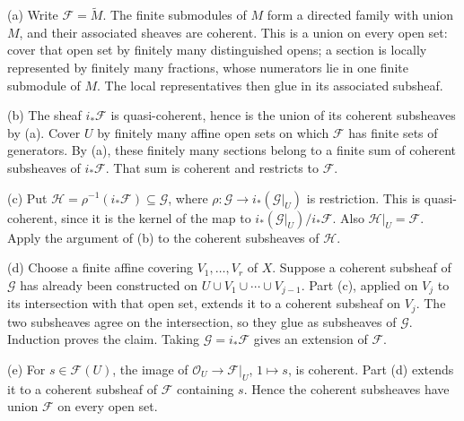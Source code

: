 (a) Write $\mathcal F=\widetilde M$. The finite submodules of $M$ form a directed family with union $M$, and their associated sheaves are coherent. This is a union on every open set: cover that open set by finitely many distinguished opens; a section is locally represented by finitely many fractions, whose numerators lie in one finite submodule of $M$. The local representatives then glue in its associated subsheaf.

(b) The sheaf $i_*\mathcal F$ is quasi-coherent, hence is the union of its coherent subsheaves by (a). Cover $U$ by finitely many affine open sets on which $\mathcal F$ has finite sets of generators. By (a), these finitely many sections belong to a finite sum of coherent subsheaves of $i_*\mathcal F$. That sum is coherent and restricts to $\mathcal F$.

(c) Put $\mathcal H=\rho^{-1}(i_*\mathcal F)\subseteq\mathcal G$, where $\rho:\mathcal G\to i_*(\mathcal G|_U)$ is restriction. This is quasi-coherent, since it is the kernel of the map to $i_*(\mathcal G|_U)/i_*\mathcal F$. Also $\mathcal H|_U=\mathcal F$. Apply the argument of (b) to the coherent subsheaves of $\mathcal H$.

(d) Choose a finite affine covering $V_1,\ldots,V_r$ of $X$. Suppose a coherent subsheaf of $\mathcal G$ has already been constructed on $U\cup V_1\cup\cdots\cup V_{j-1}$. Part (c), applied on $V_j$ to its intersection with that open set, extends it to a coherent subsheaf on $V_j$. The two subsheaves agree on the intersection, so they glue as subsheaves of $\mathcal G$. Induction proves the claim. Taking $\mathcal G=i_*\mathcal F$ gives an extension of $\mathcal F$.

(e) For $s\in\mathcal F(U)$, the image of $\mathcal O_U\to\mathcal F|_U$, $1\mapsto s$, is coherent. Part (d) extends it to a coherent subsheaf of $\mathcal F$ containing $s$. Hence the coherent subsheaves have union $\mathcal F$ on every open set.

